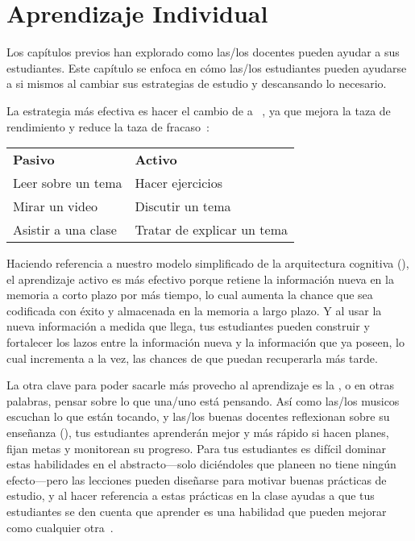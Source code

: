 \chapter{Aprendizaje Individual}\label{s:individual}

Los capítulos previos han explorado como las/los docentes pueden ayudar a sus estudiantes.
Este capítulo se enfoca en cómo las/los estudiantes pueden ayudarse a si mismos 
al cambiar sus estrategias de estudio y descansando lo necesario.

La estrategia más efectiva es hacer el cambio de  
a ~\cite{Hpl2018},
ya que mejora la taza de rendimiento y reduce la taza de fracaso~\cite{Free2014}:

\begin{longtable}{ll}
\textbf{Pasivo}		& \textbf{Activo} \\
Leer sobre un tema		& Hacer ejercicios \\
Mirar un video			& Discutir un tema \\
Asistir a una clase		& Tratar de explicar un tema
\end{longtable}

\noindent
Haciendo referencia a nuestro modelo simplificado de la arquitectura cognitiva (),
el aprendizaje activo es más efectivo porque retiene la información nueva en la memoria a corto plazo por más tiempo,
lo cual aumenta la chance que sea codificada con éxito y almacenada en la memoria a largo plazo.
Y al usar la nueva información a medida que llega, 
tus estudiantes pueden construir y fortalecer los lazos entre la información nueva y la información que ya poseen, 
lo cual incrementa a la vez, las chances de que puedan recuperarla más tarde.

La otra clave para poder sacarle más provecho al aprendizaje es la ,
o en otras palabras, pensar sobre lo que una/uno está pensando.
Así como las/los musicos escuchan lo que están tocando, 
y las/los buenas docentes reflexionan sobre su enseñanza (),
tus estudiantes aprenderán mejor y más rápido si hacen planes, 
fijan metas
y monitorean su progreso. 
Para tus estudiantes es difícil dominar estas habilidades en el abstracto---solo
diciéndoles que planeen no tiene ningún efecto---pero 
las lecciones pueden diseñarse para motivar buenas prácticas de estudio,
y al hacer referencia a estas prácticas en la clase 
ayudas a que tus estudiantes se den cuenta que aprender es una habilidad que pueden mejorar como cualquier otra~\cite{McGu2015,Miya2018}.

